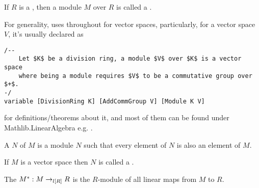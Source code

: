 \begin{definition}
    \label{VectorSpace}
    \leanok

    If $R$ is a , then a module $M$ over $R$ is called a .

\end{definition}

\begin{remark}
    \label{mk:VectorSpace}

    For generality, \Mathlib uses  throughout for vector spaces,
    particularly, for a vector space $V$, it's usually declared as

    \begin{lstlisting}[mathescape=true]
/--
    Let $K$ be a division ring, a module $V$ over $K$ is a vector space
    where being a module requires $V$ to be a commutative group over $+$.
-/
variable [DivisionRing K] [AddCommGroup V] [Module K V]
    \end{lstlisting}

    for definitions/theorems about it, and most of them can be found under \textsf{Mathlib.LinearAlgebra} e.g. .
    
\end{remark}

\begin{remark}
    \label{mk:Submodule}

    A  $N$ of $M$ is a module $N$ such that every element of $N$ is also an element of $M$.

    If $M$ is a vector space then $N$ is called a .

\end{remark}





    

\begin{definition}
    \label{Dual}
    \leanok

    The  $M^* : M \to_{l[R]} R$ is the $R$-module of all linear maps from $M$ to $R$.

\end{definition}
